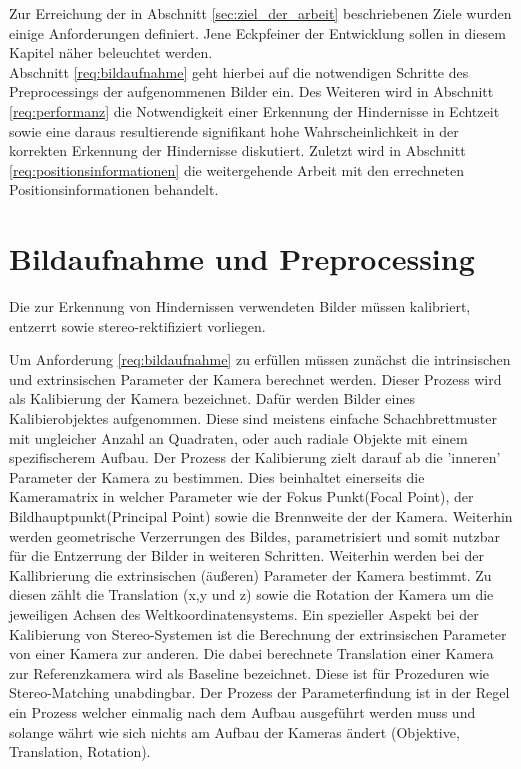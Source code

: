 Zur Erreichung der in Abschnitt \ref{sec:ziel_der_arbeit} beschriebenen Ziele wurden einige Anforderungen definiert. Jene Eckpfeiner der Entwicklung sollen in diesem Kapitel näher beleuchtet werden.\\

\noindent
Abschnitt \ref{req:bildaufnahme} geht hierbei auf die notwendigen Schritte des Preprocessings der aufgenommenen Bilder ein. Des Weiteren wird in Abschnitt \ref{req:performanz} die Notwendigkeit einer Erkennung der Hindernisse in Echtzeit sowie eine daraus resultierende signifikant hohe Wahrscheinlichkeit in der korrekten Erkennung der Hindernisse diskutiert. Zuletzt wird in Abschnitt \ref{req:positionsinformationen} die weitergehende Arbeit mit den errechneten Positionsinformationen behandelt.

\section{Bildaufnahme und Preprocessing}
\label{sec:bildaufnahme_preprocessing}

	\begin{anforderung}
	\label{req:bildaufnahme}
		Die zur Erkennung von Hindernissen verwendeten Bilder müssen kalibriert, entzerrt sowie stereo-rektifiziert vorliegen.
	\end{anforderung}

\noindent
Um Anforderung \ref{req:bildaufnahme} zu erfüllen müssen zunächst die intrinsischen und extrinsischen Parameter der Kamera berechnet werden. Dieser Prozess wird als Kalibierung der Kamera bezeichnet. Dafür werden Bilder eines Kalibierobjektes aufgenommen. Diese sind meistens einfache Schachbrettmuster mit ungleicher Anzahl an Quadraten, oder auch radiale Objekte mit einem spezifischerem Aufbau. Der Prozess der Kalibierung zielt darauf ab die 'inneren' Parameter der Kamera zu bestimmen. Dies beinhaltet einerseits die Kameramatrix in welcher Parameter wie der Fokus Punkt(Focal Point), der Bildhauptpunkt(Principal Point) sowie die Brennweite der der Kamera. Weiterhin werden geometrische Verzerrungen des Bildes,  parametrisiert und somit nutzbar für die Entzerrung der Bilder in weiteren Schritten. Weiterhin werden bei der Kallibrierung die extrinsischen (äußeren) Parameter der Kamera bestimmt. Zu diesen zählt die Translation (x,y und z) sowie die Rotation der Kamera um die jeweiligen Achsen des Weltkoordinatensystems. Ein spezieller Aspekt bei der Kalibierung von Stereo-Systemen ist die Berechnung der extrinsischen Parameter von einer Kamera zur anderen. Die dabei berechnete Translation einer Kamera zur Referenzkamera wird als Baseline bezeichnet. Diese ist für Prozeduren wie Stereo-Matching unabdingbar. Der Prozess der Parameterfindung ist in der Regel ein Prozess welcher einmalig nach dem Aufbau ausgeführt werden muss und solange währt wie sich nichts am Aufbau der Kameras ändert (Objektive, Translation, Rotation).\\

